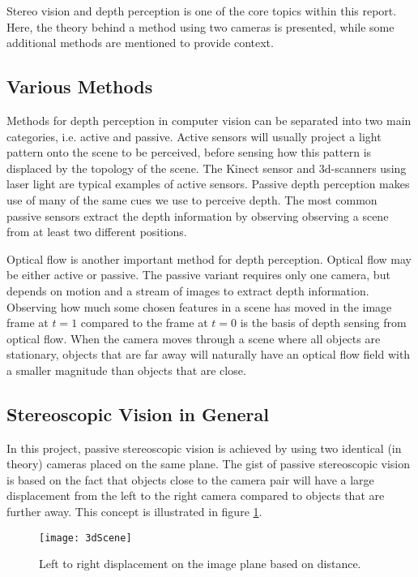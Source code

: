 Stereo vision and depth perception is one of the core topics within this report. Here, the theory behind a method using two cameras is presented, while some additional methods are mentioned to provide context. 

\subsection{Various Methods}

Methods for depth perception in computer vision can be separated into two main categories, i.e. active and passive. Active sensors will usually project a light pattern onto the scene to be perceived, before sensing how this pattern is displaced by the topology of the scene. The Kinect sensor and 3d-scanners using laser light are typical examples of active sensors. Passive depth perception makes use of many of the same cues we use to perceive depth. The most common passive sensors extract the depth information by observing observing a scene from at least two different positions. 

Optical flow is another important method for depth perception. Optical flow may be either active or passive. The passive variant requires  only one camera, but depends on motion and a stream of images to extract depth information. Observing how much some chosen features in a scene has moved in the image frame at $t = 1$ compared to the frame at $t = 0$ is the basis of depth sensing from optical flow. When the camera moves through a scene where all objects are stationary, objects that are far away will naturally have an optical flow field with a smaller magnitude than objects that are close. 

\subsection{Stereoscopic Vision in General}

In this project, passive stereoscopic vision is achieved by using two identical (in theory) cameras placed on the same plane. The gist of passive stereoscopic vision is based on the fact that objects close to the camera pair will have a large displacement from the left to the right camera compared to objects that are further away. This concept is illustrated in figure \ref{fig:3dScene}.

\begin{figure}
\centering
\texttt{[image: 3dScene]}
\caption{\label{fig:3dScene}Left to right displacement on the image plane based on distance.}
\end{figure} 

